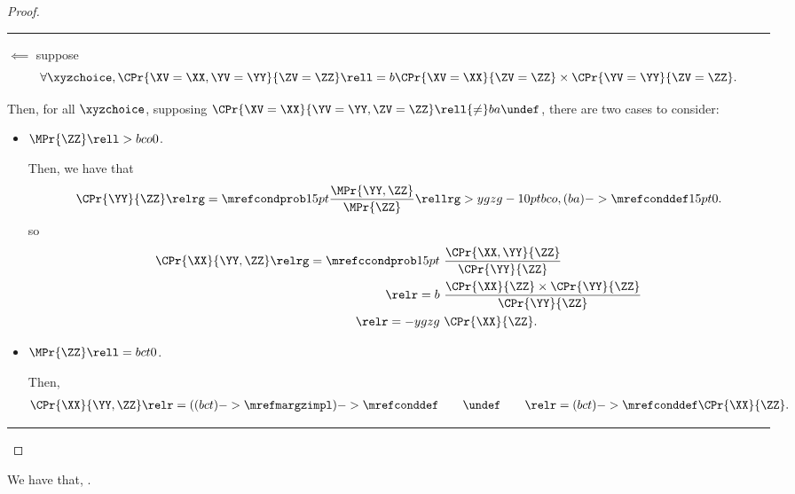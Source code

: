 \begin{proof}
  \hrule
  $\impliedby$ suppose 
  $$\forall \xyzchoice,
  \CPr{\XV = \XX, \YV = \YY}{\ZV = \ZZ} \rell = b 
  \CPr{\XV = \XX}{\ZV = \ZZ}
  \times
  \CPr{\YV = \YY}{\ZV = \ZZ}.$$

  Then, for all $\xyzchoice$, supposing $\CPr{\XV = \XX}{\YV = \YY, \ZV = \ZZ} \rell {\ne} ba \undef$, there are two cases to consider:
  \begin{itemize}
    \item {} $\MPr{\ZZ} \rell > bco 0$.

      Then, we have that
      $$\CPr{\YY}{\ZZ} \relrg = {\mrefcondprob} 15pt \frac{\MPr{ \YY, \ZZ}}{\MPr{\ZZ}} \rellrg > ygzg -10pt {bco,(ba)->\mrefconddef} 15pt 0.$$
      so
      \begin{align*}
        \CPr{\XX}{\YY, \ZZ}
        \relrg = {\mrefccondprob} 15pt \ & 
        \frac{\CPr{\XX, \YY}{\ZZ}}{\CPr{\YY}{\ZZ}}
        \\
        \relr = b \ & \frac{\CPr{\XX}{\ZZ} \times \CPr{\YY}{\ZZ}}{\CPr{\YY}{\ZZ}}\\
        \relr = -ygzg \ & \CPr{\XX}{\ZZ}.
      \end{align*}
    \item {} $\MPr{\ZZ} \rell = bct 0$.

      Then,
      \begin{align*}
        \CPr{\XX}{\YY, \ZZ}
        \relr = {((bct)->\mrefmargzimpl)->\mrefconddef}
        \ \ \ \ 
        \ \ 
        \undef
        \ \ \ \ 
        \ \ 
        \relr = {(bct)->\mrefconddef} \CPr{\XX}{\ZZ}.
      \end{align*}
  \end{itemize}
  \hrule
\end{proof}
\begin{proposition}
  We have that, \indproddefb.%
\end{proposition}
